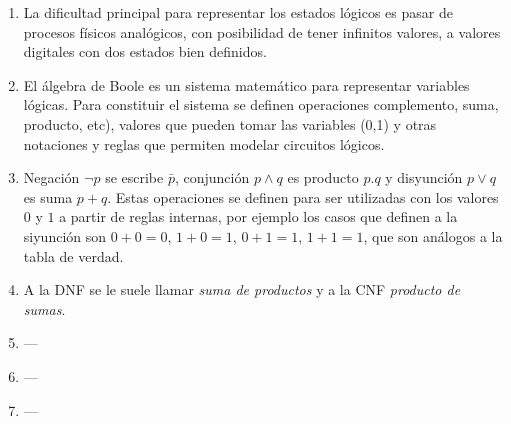 \documentclass[a4paper]{article}
\begin{document}
\begin{enumerate}
\begin{enumerate} [label=(\alph*)]
		\item La dificultad principal para representar los estados lógicos es pasar de procesos físicos analógicos, con posibilidad de tener infinitos valores, a valores digitales con dos estados bien definidos. 
		\item El álgebra de Boole es un sistema matemático para representar variables lógicas. Para constituir el sistema se definen operaciones complemento, suma, producto, etc), valores que pueden tomar las variables (0,1) y otras notaciones y reglas que permiten modelar circuitos lógicos.
		\item Negación $\neg p$ se escribe $\bar{p}$, conjunción $p\land q$ es producto $p.q$ y disyunción $p \lor q$ es suma $p+q$. Estas operaciones se definen para ser utilizadas con los valores $0$ y $1$ a partir de reglas internas, por ejemplo los casos que definen a la siyunción son $0+0=0$, $1+0=1$, $0+1=1$, $1+1=1$, que son análogos a la tabla de verdad.
		\item A la DNF se le suele llamar \textit{suma de productos} y a la CNF \textit{producto de sumas}.
\item ---\item ---\item ---\end{enumerate}\end{enumerate}
\end{document}
